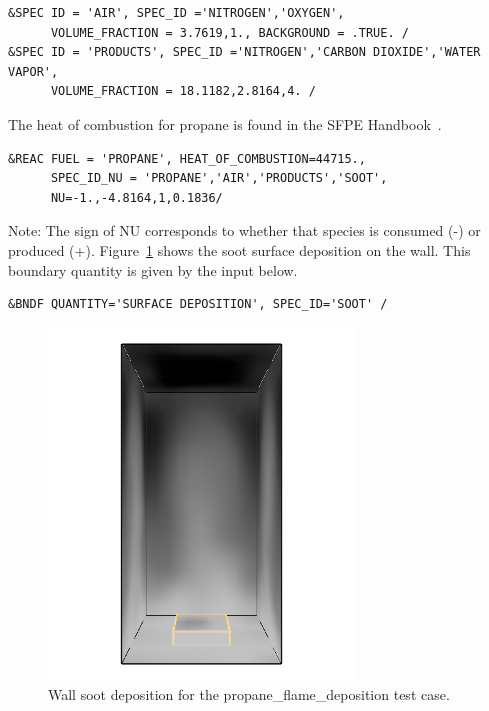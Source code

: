 \documentclass[11pt]{book}
\begin{document}
\begin{lstlisting}
&SPEC ID = 'AIR', SPEC_ID ='NITROGEN','OXYGEN',
      VOLUME_FRACTION = 3.7619,1., BACKGROUND = .TRUE. /
&SPEC ID = 'PRODUCTS', SPEC_ID ='NITROGEN','CARBON DIOXIDE','WATER VAPOR',
      VOLUME_FRACTION = 18.1182,2.8164,4. /
\end{lstlisting}

\noindent
The heat of combustion for propane is found in the SFPE Handbook~\cite{SFPE:Tewarson}.

\begin{lstlisting}
&REAC FUEL = 'PROPANE', HEAT_OF_COMBUSTION=44715.,
      SPEC_ID_NU = 'PROPANE','AIR','PRODUCTS','SOOT',
      NU=-1.,-4.8164,1,0.1836/
\end{lstlisting}

\noindent
Note: The sign of {\ct NU} corresponds to whether that species is consumed (-) or produced (+). Figure~\ref{soot_deposition} shows the soot surface deposition on the wall.  This boundary quantity is given by the input below.

\begin{lstlisting}
&BNDF QUANTITY='SURFACE DEPOSITION', SPEC_ID='SOOT' /
\end{lstlisting}

\begin{figure}[ht]
\centering
\includegraphics[width=3.2in]{SCRIPT_FIGURES/propane_flame_deposition}
\caption[Wall soot deposition for the {\ct propane\_flame\_deposition} test case]{Wall soot deposition for the {\ct propane\_flame\_deposition} test case.}
\label{soot_deposition}
\end{figure}
\end{document}
